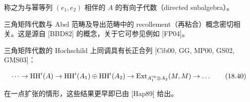 称之为与幂等列 $(e_1,e_2)$ 相伴的 $A$ 的有向子代数（directed subalgebra）。

三角矩阵代数与 Abel 范畴及导出范畴中的 recollement（再粘合）概念密切相关。这是源自 [BBD82] 的概念，关于它可参见例如 [FP04]。

三角矩阵代数的 Hochschild 上同调具有长正合列 [Cib00, GG, MP00, GS02, GMS03]：

\begin{equation}
  \dots \to \mathrm{HH}^{i}(A) \to \mathrm{HH}^{i}(A_1)\oplus\mathrm{HH}^{i}(A_2)
  \to \operatorname{Ext}_{A_1^{\mathrm{op}}\otimes A_2}(M,M) \to \dots \tag{18.40}
\end{equation}

在一点扩张的情形，这些结果更早即已由 [Hap89] 给出。

